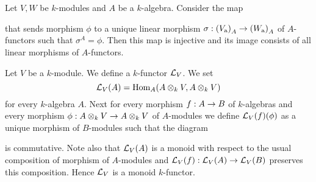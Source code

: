 \begin{corollary}\label{corollary:idenitificationoflinearmorphismsoffunctors}
Let $V, W$ be $k$-modules and $A$ be a $k$-algebra. Consider the map
\begin{center}
\end{center}
that sends morphism $\phi$ to a unique linear morphism $\sigma:\left(V_{\mathrm{a}}\right)_A\rightarrow \left(W_{\mathrm{a}}\right)_A$ of $A$-functors such that $\sigma^A = \phi$. Then this map is injective and its image consists of all linear morphisms of $A$-functors.
\end{corollary}

\begin{example}\label{example:linearmonoid}
Let $V$ be a $k$-module. We define a $k$-functor ${\mathcal L}_V$. We set
$${\mathcal L}_V(A) = \mathrm{Hom}_A(A\otimes_kV,A\otimes_kV)$$
for every $k$-algebra $A$. Next for every morphism $f:A\rightarrow B$ of $k$-algebras and every morphism $\phi:A\otimes_kV\rightarrow A\otimes_kV$ of $A$-modules we define ${\mathcal L}_V(f)(\phi)$ as a unique morphism of $B$-modules such that the diagram
\begin{center}
\end{center}
is commutative. Note also that ${\mathcal L}_V(A)$ is a monoid with respect to the usual composition of morphism of $A$-modules and ${\mathcal L}_V(f):{\mathcal L}_V(A)\rightarrow {\mathcal L}_V(B)$ preserves this composition. Hence ${\mathcal L}_V$ is a monoid $k$-functor.
\end{example}

